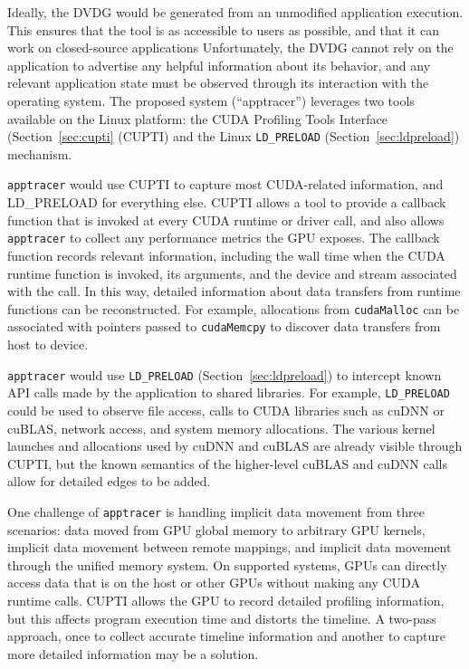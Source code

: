 Ideally, the DVDG would be generated from an unmodified application execution.
This ensures that the tool is as accessible to users as possible, and that it can work on closed-source applications
Unfortunately, the DVDG cannot rely on the application to advertise any helpful information about its behavior, and any relevant application state must be observed through its interaction with the operating system.
The proposed system (``apptracer'') leverages two tools available on the Linux platform: the CUDA Profiling Tools Interface (Section~\ref{sec:cupti} (CUPTI) and the Linux \texttt{LD\_PRELOAD} (Section~\ref{sec:ldpreload}) mechanism.

\texttt{apptracer} would use CUPTI to capture most CUDA-related information, and LD\_PRELOAD for everything else.
CUPTI allows a tool to provide a callback function that is invoked at every CUDA runtime or driver call, and also allows \texttt{apptracer} to collect any performance metrics the GPU exposes.
The callback function records relevant information, including the wall time when the CUDA runtime function is invoked, its arguments, and the device and stream associated with the call.
In this way, detailed information about data transfers from runtime functions can be reconstructed.
For example, allocations from \texttt{cudaMalloc} can be associated with pointers passed to \texttt{cudaMemcpy} to discover data transfers from host to device.

\texttt{apptracer} would use \texttt{LD\_PRELOAD} (Section~\ref{sec:ldpreload}) to intercept known API calls made by the application to shared libraries.
For example, \texttt{LD\_PRELOAD} could be used to observe file access, calls to CUDA libraries such as cuDNN or cuBLAS, network access, and system memory allocations.
The various kernel launches and allocations used by cuDNN and cuBLAS are already visible through CUPTI, but the known semantics of the higher-level cuBLAS and cuDNN calls allow for detailed edges to be added.

One challenge of \texttt{apptracer} is handling implicit data movement from three scenarios:
data moved from GPU global memory to arbitrary GPU kernels, implicit data movement between remote mappings, and implicit data movement through the unified memory system.
On supported systems, GPUs can directly access data that is on the host or other GPUs without making any CUDA runtime calls.
CUPTI allows the GPU to record detailed profiling information, but this affects program execution time and distorts the timeline.
A two-pass approach, once to collect accurate timeline information and another to capture more detailed information may be a solution.

